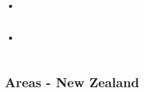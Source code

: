 \begin{scriptsize}
\begin{itemize}
\textcite{fabe20} \\
\textcite{vaga20} \\
\textcite{nemc20} \\
\item[\twothousandtwentyone] 
\textcite{erhf21} \\
\textcite{lofy21} \\
\item[\twothousandtwentytwo] 
\textcite{cobf22} \\
\textcite{pefv22} \\
\end{itemize}
\end{scriptsize}

\subsection{Areas - New Zealand} 

